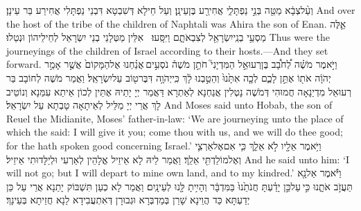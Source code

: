 {וְעַ֨ל\maqqaf צְבָ֔א מַטֵּ֖ה בְּנֵ֣י נַפְתָּלִ֑י אֲחִירַ֖ע בֶּן\maqqaf עֵינָֽן׃}
{וְעַל חֵילָא דְּשִׁבְטָא דִּבְנֵי נַפְתָּלִי אֲחִירַע בַּר עֵינָן׃}
{And over the host of the tribe of the children of Naphtali was Ahira the son of Enan.}{}
{אֵ֛לֶּה מַסְעֵ֥י בְנֵֽי\maqqaf יִשְׂרָאֵ֖ל לְצִבְאֹתָ֑ם וַיִּסָּֽעוּ׃ \setuma }
{אִלֵּין מַטְּלָנֵי בְנֵי יִשְׂרָאֵל לְחֵילֵיהוֹן וּנְטַלוּ׃}
{Thus were the journeyings of the children of Israel according to their hosts.—And they set forward.}{}
{וַיֹּ֣אמֶר מֹשֶׁ֗ה לְ֠חֹבָ֠ב בֶּן\maqqaf רְעוּאֵ֣ל הַמִּדְיָנִי֮ חֹתֵ֣ן מֹשֶׁה֒ נֹסְעִ֣ים \legarmeh  אֲנַ֗חְנוּ אֶל\maqqaf הַמָּקוֹם֙ אֲשֶׁ֣ר אָמַ֣ר יְהֹוָ֔ה אֹת֖וֹ אֶתֵּ֣ן לָכֶ֑ם לְכָ֤ה אִתָּ֙נוּ֙ וְהֵטַ֣בְנוּ לָ֔ךְ כִּֽי\maqqaf יְהֹוָ֥ה דִּבֶּר\maqqaf ט֖וֹב עַל\maqqaf יִשְׂרָאֵֽל׃}
{וַאֲמַר מֹשֶׁה לְחוֹבָב בַּר רְעוּאֵל מִדְיַנָאָה חֲמוּהִי דְּמֹשֶׁה נָטְלִין אֲנַחְנָא לְאַתְרָא דַּאֲמַר יְיָ יָתֵיהּ אֶתֵּין לְכוֹן אֵיתַא עִמַּנָא וְנוֹטֵיב לָךְ אֲרֵי יְיָ מַלֵּיל לְאֵיתָאָה טָבְתָא עַל יִשְׂרָאֵל׃}
{And Moses said unto Hobab, the son of Reuel the Midianite, Moses’ father-in-law: ‘We are journeying unto the place of which the \lord\space said: I will give it you; come thou with us, and we will do thee good; for the \lord\space hath spoken good concerning Israel.’}{}
{וַיֹּ֥אמֶר אֵלָ֖יו לֹ֣א אֵלֵ֑ךְ כִּ֧י אִם\maqqaf אֶל\maqqaf אַרְצִ֛י וְאֶל\maqqaf מוֹלַדְתִּ֖י אֵלֵֽךְ׃}
{וַאֲמַר לֵיהּ לָא אֵיזֵיל אֱלָהֵין לְאַרְעִי וּלְיַלָּדוּתִי אֵיזֵיל׃}
{And he said unto him: ‘I will not go; but I will depart to mine own land, and to my kindred.’}{}
{וַיֹּ֕אמֶר אַל\maqqaf נָ֖א תַּעֲזֹ֣ב אֹתָ֑נוּ כִּ֣י \legarmeh  עַל\maqqaf כֵּ֣ן יָדַ֗עְתָּ חֲנֹתֵ֙נוּ֙ בַּמִּדְבָּ֔ר וְהָיִ֥יתָ לָּ֖נוּ לְעֵינָֽיִם׃}
{וַאֲמַר לָא כְעַן תִּשְׁבּוֹק יָתַנָא אֲרֵי עַל כֵּן יְדַעְתָּא כַּד הֲוֵינָא שָׁרַן בְּמַדְבְּרָא וּגְבוּרָן דְּאִתְעֲבִידָא לַנָא חֲזֵיתָא בְּעֵינָךְ׃}
